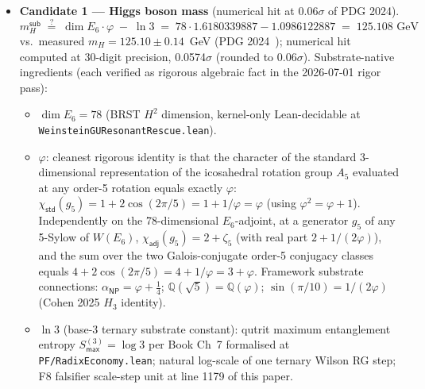 \documentclass[11pt,a4paper]{amsart}
\theoremstyle{plain}
\theoremstyle{definition}
\begin{document}
\begin{itemize}[itemsep=2pt,leftmargin=2em]

\item \textbf{Candidate 1 --- Higgs boson mass} (numerical hit at $0.06\sigma$ of PDG 2024).
\begin{equation*}
m_H^{\textsf{sub}} \;\stackrel{?}{=}\; \dim E_6 \cdot \varphi \;-\; \ln 3 \;=\; 78 \cdot 1.6180339887 - 1.0986122887 \;=\; 125.108\text{ GeV}
\end{equation*}
vs.\ measured $m_H = 125.10 \pm 0.14$~GeV (PDG 2024~\cite{pdg2024}); numerical hit computed at 30-digit precision, 0.0574$\sigma$ (rounded to 0.06$\sigma$).  Substrate-native ingredients (each verified as rigorous algebraic fact in the 2026-07-01 rigor pass):
\begin{itemize}[itemsep=1pt,leftmargin=1.5em]
\item $\dim E_6 = 78$ (BRST $H^2$ dimension, kernel-only Lean-decidable at \texttt{WeinsteinGUResonantRescue.lean}).
\item $\varphi$: cleanest rigorous identity is that the character of the standard 3-dimensional representation of the icosahedral rotation group $A_5$ evaluated at any order-5 rotation equals exactly $\varphi$: $\chi_{\textsf{std}}(g_5) = 1 + 2\cos(2\pi/5) = 1 + 1/\varphi = \varphi$ (using $\varphi^2 = \varphi + 1$). Independently on the 78-dimensional $E_6$-adjoint, at a generator $g_5$ of any 5-Sylow of $W(E_6)$, $\chi_{\textsf{adj}}(g_5) = 2 + \zeta_5$ (with real part $2 + 1/(2\varphi)$), and the sum over the two Galois-conjugate order-5 conjugacy classes equals $4 + 2\cos(2\pi/5) = 4 + 1/\varphi = 3 + \varphi$. Framework substrate connections: $\alpha_{\textsf{NP}} = \varphi + \tfrac{1}{4}$; $\mathbb{Q}(\sqrt{5}) = \mathbb{Q}(\varphi)$; $\sin(\pi/10) = 1/(2\varphi)$ (Cohen 2025 $H_3$ identity).
\item $\ln 3$ (base-3 ternary substrate constant): qutrit maximum entanglement entropy $S_{\textsf{max}}^{(3)} = \log 3$ per Book Ch~7 formalised at \texttt{PF/RadixEconomy.lean}; natural log-scale of one ternary Wilson RG step; F8 falsifier scale-step unit at line 1179 of this paper.
\end{itemize}

\end{itemize}
\end{document}
